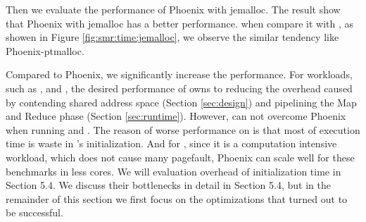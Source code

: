 Then we evaluate the performance of Phoenix with jemalloc.
The result show that Phoenix with jemalloc has a better performance.
when compare it with \myds, as showen in Figure \ref{fig:smr:time:jemalloc}, 
we observe the similar tendency like Phoenix-ptmalloc.


Compared to Phoenix, we significantly increase the performance.
For workloads, such as ,  and , the desired performance of \myds owns to reducing the overhead caused by contending shared address space (Section \ref{sec:design}) and pipelining the Map and Reduce phase (Section \ref{sec:runtime}).
However, \myds can not overcome Phoenix when running  and . 
The reason of worse performance on  is that most of execution time is waste in \myds's initialization.
And for , since it is a computation intensive workload, which does not cause many pagefault, Phoenix can scale well for these benchmarks in less cores.
We will evaluation overhead of initialization time in Section 5.4.
We discuss their bottlenecks in detail in Section 5.4, but in the remainder of this section we first focus on the optimizations that turned out to be successful.




%

